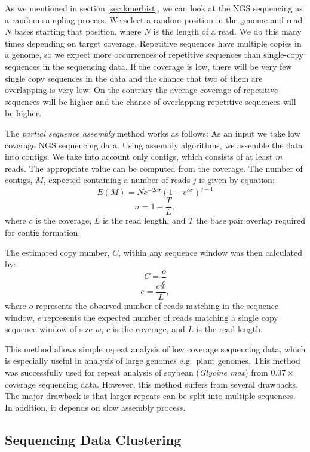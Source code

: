 As we mentioned in section \ref{sec:kmerhist}, we can look at the NGS sequencing as a random sampling process. We select a random position in the genome and read $N$ bases starting that position, where $N$ is the length of a read. We do this many times depending on target coverage.
Repetitive sequences have multiple copies in a genome, so we expect more occurrences of repetitive sequences than single-copy sequences in the sequencing data. If the coverage is low, there will be very few single copy sequences in the data and the chance that two of them are overlapping is very low. On the contrary the average coverage of repetitive sequences will be higher and the chance of overlapping repetitive sequences will be higher.

The \emph{partial sequence assembly} method works as follows: As an input we take low coverage NGS sequencing data. Using assembly algorithms, we assemble the data into contigs. We take into account only contigs, which consists of at least $m$ reads. The appropriate value can be computed from the coverage. The number of contigs, $M$, expected containing a number of reads $j$ is given by equation\cite{swaminathan2007global}:
$$E(M) = Ne^{-2c\sigma}(1-e^{c\sigma})^{j-1}$$
$$\sigma = 1 - \frac{T}{L},$$
where $c$ is the coverage, $L$ is the read length, and $T$ the base pair overlap required for contig formation.

The estimated copy number, $C$, within any sequence window was then calculated by\cite{swaminathan2007global}:
$$C = \frac{o}{e}$$
$$e = \frac{cw}{L},$$
where $o$ represents the observed number of reads matching in the sequence window, $e$ represents the expected number of reads matching a single copy sequence window of size $w$, $c$ is the coverage, and $L$ is the read length.

This method allows simple repeat analysis of low coverage sequencing data, which is especially useful in analysis of large genomes e.g.\ plant genomes. This method was successfully used for repeat analysis of soybean (\textit{Glycine max}) from $0.07\times$ coverage sequencing data\cite{swaminathan2007global}.
However, this method suffers from several drawbacks. The major drawback is that larger repeats can be split into multiple sequences. In addition, it depends on slow assembly process.

\subsection{Sequencing Data Clustering}


